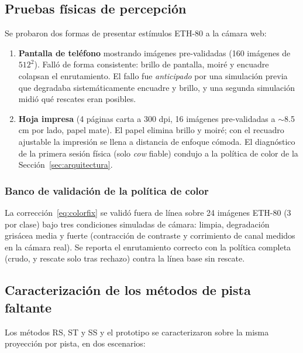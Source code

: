 \subsection{Pruebas físicas de percepción}
\label{sec:met_fisica}

Se probaron dos formas de presentar estímulos ETH-80 a la cámara web:

\begin{enumerate}
    \item \textbf{Pantalla de teléfono} mostrando imágenes pre-validadas
    (160 imágenes de $512^2$).
    Falló de forma consistente: brillo de pantalla, moiré y encuadre colapsan el
    enrutamiento.
    El fallo fue \emph{anticipado} por una simulación previa que degradaba
    sistemáticamente encuadre y brillo, y una segunda simulación midió qué rescates
    eran posibles.

    \item \textbf{Hoja impresa} (4 páginas carta a 300 dpi, 16 imágenes pre-validadas
    a $\sim$8.5 cm por lado, papel mate).
    El papel elimina brillo y moiré; con el recuadro ajustable la impresión se llena a
    distancia de enfoque cómoda.
    El diagnóstico de la primera sesión física (solo \textit{cow} fiable) condujo a la
    política de color de la Sección~\ref{sec:arquitectura}.
\end{enumerate}

\subsubsection*{Banco de validación de la política de color}

La corrección~\eqref{eq:colorfix} se validó fuera de línea sobre 24 imágenes ETH-80
(3 por clase) bajo tres condiciones simuladas de cámara: limpia, degradación grisácea
media y fuerte (contracción de contraste y corrimiento de canal medidos en la cámara
real).
Se reporta el enrutamiento correcto con la política completa (crudo, y rescate solo
tras rechazo) contra la línea base sin rescate.

\subsection{Caracterización de los métodos de pista faltante}
\label{sec:met_pista}

Los métodos RS, ST y SS y el prototipo se caracterizaron sobre la misma proyección por
pista, en dos escenarios:

